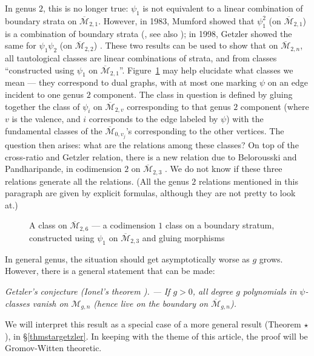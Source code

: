 \documentclass[12pt,letterpaper]{amsart}
\newcommand{\tpoint}[1]{\vspace{3mm}\par \noindent \refstepcounter{subsection}{\bf \thesubsection.} 
  {\em #1. ---} }
\newcommand{\cm}{{\mathcal{M}}}
\newcommand{\cmbar}{\overline{\cm}}
\newcommand{\lremind}[1]{{\bf[label:  #1]}}
\renewcommand{\lremind}[1]{{}}
\begin{document}
{In genus $2$, this is no longer true: $\psi_1$ is not equivalent to a
linear combination of boundary strata on $\cmbar_{2,1}$.  However, in
1983, Mumford showed that $\psi_1^2$ (on $\cmbar_{2,1}$) is a
combination of boundary strata (\cite{mumford}, see also \cite[eqn.\
(4)]{g2}); in 1998, Getzler showed the same for $\psi_1 \psi_2$ (on
$\cmbar_{2,2}$) \cite{g2}.  These two results can be used to show that
on $\cmbar_{2,n}$, all tautological classes are linear combinations of
strata, and from classes ``constructed using $\psi_1$ on
$\cmbar_{2,1}$''.  Figure~\ref{m21} may help elucidate what classes we
mean --- they correspond to dual graphs, with at most one marking
$\psi$ on an edge incident to one genus $2$ component.  The class in
question is defined by gluing together the class of $\psi_i$ on
$\cmbar_{2,v}$ corresponding to that genus $2$ component (where $v$ is
the valence, and $i$ corresponds to the edge labeled by $\psi$) with
the fundamental classes of the $\cmbar_{0,v_j}$'s corresponding to the
other vertices.  The question then arises: what are the relations
among these classes?  On top of the cross-ratio and Getzler relation,
there is a new relation due to Belorousski and Pandharipande, in
codimension $2$ on $\cmbar_{2,3}$ \cite{bp}.  We do not know if these
three relations generate all the relations.  (All the genus $2$
relations mentioned in this paragraph are given by explicit formulas,
although they are not pretty to look at.)
\begin{figure}
\begin{center}

\end{center}
\caption{A class on $\cmbar_{2,6}$ --- a codimension $1$ class
on a boundary stratum, constructed using $\psi_1$ on $\cmbar_{2,3}$ and gluing
morphisms\lremind{m21}}\label{m21}
\end{figure}

In general genus, the situation should get asymptotically worse
as $g$ grows.  However, there is a general statement that can be made:

\tpoint{Getzler's conjecture \cite[footnote~1]{g2} (Ionel's theorem
  \cite{i1})} {\em If $g>0$, all degree $g$ polynomials in
  $\psi$-classes vanish on $\cm_{g,n}$ (hence live on the boundary on
  $\cmbar_{g,n}$).} \label{getzlerconj}\lremind{getzlerconj}

We will interpret this result as a special case of a more general
result (Theorem $\star$), in  \S \ref{thmstargetzler}.  In keeping with the theme of this article,
the proof will  be Gromov-Witten theoretic.

}
\end{document}

